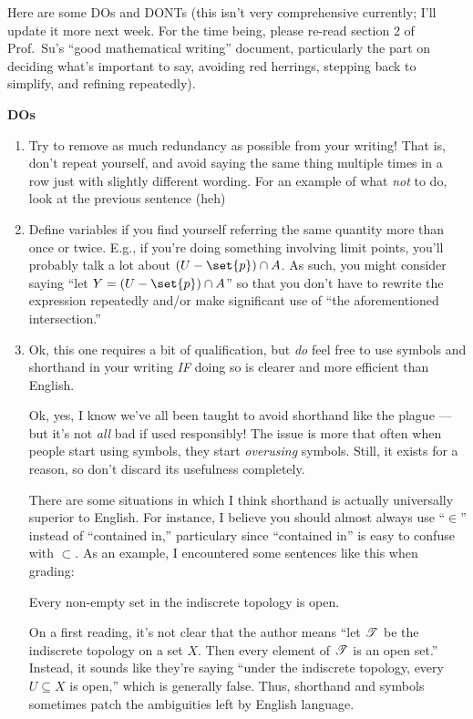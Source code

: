 \documentclass{fkpset}
\begin{document}
Here are some DOs and DONTs (this isn't very comprehensive currently; I'll
update it more next week. For the time being, please re-read section 2 of Prof.\
Su's ``good mathematical writing'' document, particularly the part on deciding
what's important to say, avoiding red herrings, stepping back to simplify, and
refining repeatedly).

\textbf{DOs}
\begin{enumerate}[label=(\arabic*)]
  \item Try to remove as much redundancy as possible from your writing! That is,
    don't repeat yourself, and avoid saying the same thing multiple times in a
    row just with slightly different wording. For an example of what \emph{not}
    to do, look at the previous sentence (heh)
  \item Define variables if you find yourself referring the same quantity more
    than once or twice. E.g., if you're doing something involving limit points,
    you'll probably talk a lot about $(U - \set{p}) \cap A$. As such, you might
    consider saying ``let $Y = (U - \set{p}) \cap A$'' so that you don't have to
    rewrite the expression repeatedly and/or make significant use of ``the
    aforementioned intersection.''
  \item Ok, this one requires a bit of qualification, but \emph{do} feel free to
    use symbols and shorthand in your writing \emph{IF} doing so is clearer and
    more efficient than English.

    Ok, yes, I know we've all been taught to avoid shorthand like the plague ---
    but it's not \emph{all} bad if used responsibly! The issue is more that
    often when people start using symbols, they start \emph{overusing} symbols.
    Still, it exists for a reason, so don't discard its usefulness completely.

    There are some situations in which I think shorthand is actually universally
    superior to English. For instance, I believe you should almost always use
    ``$\in$'' instead of ``contained in,'' particulary since ``contained in'' is
    easy to confuse with $\subset$. As an example, I encountered some sentences
    like this when grading:
    \begin{leftbar}
      Every non-empty set in the indiscrete topology is open.
    \end{leftbar}
    On a first reading, it's not clear that the author means ``let $\mathscr{T}$ be
    the indiscrete topology on a set $X$. Then every element of $\mathscr{T}$ is an
    open set.'' Instead, it sounds like they're saying ``under the indiscrete
    topology, every $U \subseteq X$ is open,'' which is generally false. Thus,
    shorthand and symbols sometimes patch the ambiguities left by English
    language.


\end{enumerate}
\end{document}
